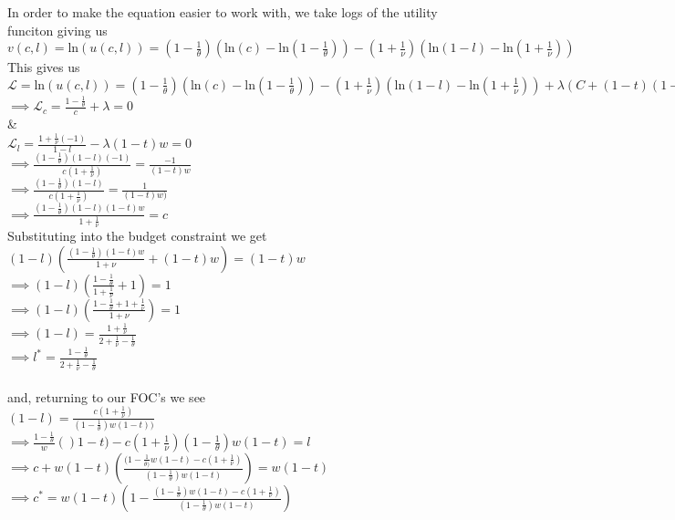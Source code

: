 \documentclass[11pt]{SelfArxOneColBMN}
\begin{document}
	\begin{solution}
		In order to make the equation easier to work with, we take logs of the utility funciton giving us\\
		$v(c,l) = \text{ln}(u(c,l)) = (1 - \frac{1}{\theta})(\text{ln}(c) - \text{ln}(1 - \frac{1}{\theta})) - (1 + \frac{1}{\nu})(\text{ln}(1 - l) - \text{ln}(1 + \frac{1}{\nu}))$\\
		This gives us $\mathcal{L} = \text{ln}(u(c,l)) = (1 - \frac{1}{\theta})(\text{ln}(c) - \text{ln}(1 - \frac{1}{\theta})) - (1 + \frac{1}{\nu})(\text{ln}(1 - l) - \text{ln}(1 + \frac{1}{\nu})) + \lambda(C + (1 - t)(1 - l)w - (1 - t)w)$\\
		$\implies \mathcal{L}_c = \frac{1 - \frac{1}{\theta}}{c} + \lambda = 0$\\
		\&\\
		$\mathcal{L}_l = \frac{1 + \frac{1}{\nu}(-1)}{1 - l} - \lambda(1 - t)w = 0$\\
		$\implies \frac{(1 - \frac{1}{\theta})(1 - l)(-1)}{c(1 + \frac{1}{\nu})} = \frac{-1}{(1 - t)w}$\\
		$\implies \frac{(1 - \frac{1}{\theta})(1 - l)}{c(1 + \frac{1}{\nu})} = \frac{1}{(1 - t)w)}$\\
		$\implies \frac{(1 - \frac{1}{\theta})(1 - l)(1 - t)w}{1 + \frac{1}{\nu}} = c$\\
		Substituting into the budget constraint we get\\
		$(1 - l)(\frac{(1 - \frac{1}{\theta})(1 - t)w}{1 + \nu} + (1-t)w) = (1 - t)w$\\
		$\implies (1 - l)(\frac{1 - \frac{1}{\theta}}{1 + \frac{1}{\nu}} + 1) = 1$\\
		$\implies (1 - l)(\frac{1 - \frac{1}{\theta} + 1 + \frac{1}{\nu}}{1 + \nu}) = 1$\\
		$\implies (1 - l) = \frac{1 + \frac{1}{\nu}}{2 + \frac{1}{\nu} - \frac{1}{\theta}}$\\
		$\implies l^* = \frac{1- \frac{1}{\theta}}{2 + \frac{1}{\nu} - \frac{1}{\theta}}$\\
		\\
		and, returning to our FOC's we see\\
		$(1 - l) = \frac{c(1 + \frac{1}{\nu})}{(1 - \frac{1}{\theta})w(1 - t))}$\\
		$\implies \frac{1 - \frac{1}{\theta}}w()1 - t) - c(1 + \frac{1}{\nu}){(1 - \frac{1}{\theta})w(1 - t)} = l$\\
		$\implies c + w(1 - t)(\frac{(1 - \frac{1}{\theta)}w(1-t) - c(1 + \frac{1}{\nu})}{(1 - \frac{1}{\theta})w(1 - t)})= w(1 - t)$\\
		$\implies c^* = w(1 - t)(1 - \frac{(1 - \frac{1}{\theta})w(1 - t) - c(1 + \frac{1}{\nu})}{(1 - \frac{1}{\theta})w(1 - t)})$
	\end{solution}
\end{document}
